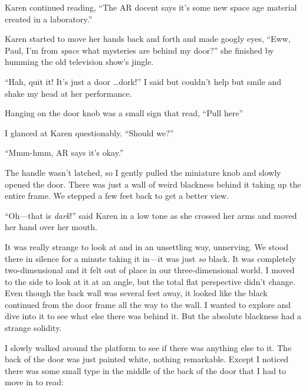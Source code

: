Karen continued reading, ``The AR docent says it's some new
space age material created in a laboratory.''

Karen started to move her hands back and forth and made googly
eyes, ``Eww, Paul, I'm from \emph{space} what mysteries are
behind my door?'' she finished by humming the old television
show's jingle.

``Hah, quit it! It's just a door \ldots dork!'' I said but
couldn't help but smile and shake my head at her performance.


Hanging on the door knob was a small sign that read, ``Pull here''

I glanced at Karen questionably. ``Should we?''

``Mmm-hmm, AR says it's okay.''

The handle wasn't latched, so I gently pulled the miniature knob
and slowly opened the door. There was just a wall of weird
blackness behind it taking up the entire frame. We stepped a few
feet back to get a better view.

``Oh---that is \emph{dark}!'' said Karen in a low tone as
she crossed her arms and moved her hand over her mouth.


It was really strange to look at and in an unsettling way,
unnerving. We stood there in silence for a minute taking it
in---it was just \emph{so} black. It was completely
two-dimensional and it felt out of place in our
three-dimensional world. I moved to the side to look at it at
an angle, but the total flat perspective didn't change.  Even
though the back wall was several feet away, it looked like the
black continued from the door frame all the way to the wall.  I
wanted to explore and dive into it to see what else there was
behind it. But the absolute blackness had a strange
solidity.


I slowly walked around the platform to see if there was anything
else to it. The back of the door was just painted white, nothing
remarkable. Except I noticed there was some small type in the
middle of the back of the door that I had to move in to read:



